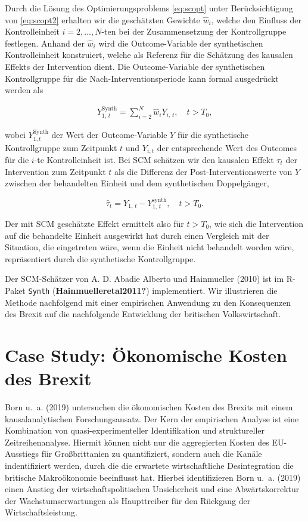 \documentclass[
  a4paper,
  DIV=11,
  oneside]{scrreprt}
\begin{document}
Durch die Lösung des Optimierungsproblems \eqref{eq:scopt} unter
Berücksichtigung von \eqref{eq:scopt2} erhalten wir die geschätzten
Gewichte \(\widehat{w}_i\), welche den Einfluss der Kontrolleinheit
\(i=2,\dots,N\)-ten bei der Zusammensetzung der Kontrollgruppe
festlegen. Anhand der \(\widehat{w}_i\) wird die Outcome-Variable der
synthetischen Kontrolleinheit konstruiert, welche als Referenz für die
Schätzung des kausalen Effekts der Intervention dient. Die
Outcome-Variable der synthetischen Kontrollgruppe für die
Nach-Interventionsperiode kann formal ausgedrückt werden als

\begin{align}
  Y_{1,\,t}^{\text{Synth}} = \sum_{i=2}^{N} \widehat{w}_i Y_{i,\,t},\quad t > T_0,\label{eq:dgkonst}
\end{align}

wobei \(Y_{1,t}^{\text{Synth}}\) der Wert der Outcome-Variable \(Y\) für
die synthetische Kontrollgruppe zum Zeitpunkt \(t\) und \(Y_{i,t}\) der
entsprechende Wert des Outcomes für die \(i\)-te Kontrolleinheit ist.
Bei SCM schätzen wir den kausalen Effekt \(\tau_t\) der Intervention zum
Zeitpunkt \(t\) als die Differenz der Post-Interventionswerte von \(Y\)
zwischen der behandelten Einheit und dem synthetischen Doppelgänger,

\[
\widehat{\tau}_t = Y_{1,\,t} - Y_{1,\,t}^{\text{synth}},\quad t > T_0.
\]

Der mit SCM geschätzte Effekt ermittelt also für \(t > T_0\), wie sich
die Intervention auf die behandelte Einheit ausgewirkt hat durch einen
Vergleich mit der Situation, die eingetreten wäre, wenn die Einheit
nicht behandelt worden wäre, repräsentiert durch die synthetische
Kontrollgruppe.

Der SCM-Schätzer von A. D. Abadie Alberto und Hainmueller (2010) ist im
R-Paket \texttt{Synth} (\textbf{Hainmuelleretal2011?}) implementiert.
Wir illustrieren die Methode nachfolgend mit einer empirischen Anwendung
zu den Konsequenzen des Brexit auf die nachfolgende Entwicklung der
britischen Volkswirtschaft.

\section{Case Study: Ökonomische Kosten des
Brexit}\label{case-study-uxf6konomische-kosten-des-brexit}

Born u.~a. (2019) untersuchen die ökonomischen Kosten des Brexits mit
einem kausalanalytischen Forschungsansatz. Der Kern der empirischen
Analyse ist eine Kombination von quasi-experimenteller Identifikation
und struktureller Zeitreihenanalyse. Hiermit können nicht nur die
aggregierten Kosten des EU-Ausstiegs für Großbrittanien zu
quantifiziert, sondern auch die Kanäle indentifiziert werden, durch die
die erwartete wirtschaftliche Desintegration die britische Makroökonomie
beeinflusst hat. Hierbei identifizieren Born u.~a. (2019) einen Anstieg
der wirtschaftspolitischen Unsicherheit und eine Abwärtskorrektur der
Wachstumserwartungen als Haupttreiber für den Rückgang der
Wirtschaftsleistung.
\end{document}
